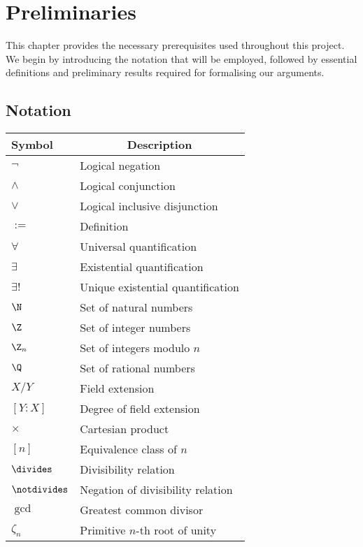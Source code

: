 \chapter{Preliminaries}

This chapter provides the necessary prerequisites used throughout this project.
We begin by introducing the notation that will be employed, followed by essential definitions and
preliminary results required for formalising our arguments.

\section{Notation}


\begin{tabular}{>{\centering}m{1.8cm} m{5.8cm}}
\toprule
\textbf{Symbol} & \multicolumn{1}{c}{\textbf{Description}} \\
\midrule
$\lnot$ & Logical negation \\
$\land$ & Logical conjunction \\
$\lor$ & Logical inclusive disjunction \\
$:=$   & Definition \\
$\forall$ & Universal quantification \\
$\exists$ & Existential quantification \\
$\exists!$ & Unique existential quantification \\
$\N$ & Set of natural numbers \\
$\Z$ & Set of integer numbers \\
$\Z_n$ & Set of integers modulo $n$ \\
$\Q$ & Set of rational numbers \\
$X/Y$ & Field extension \\
$[Y:X]$ & Degree of field extension \\
$\times$ & Cartesian product \\
$[n]$ & Equivalence class of $n$ \\
$\divides$ & Divisibility relation \\
$\notdivides$ & Negation of divisibility relation \\
$\gcd$ & Greatest common divisor \\
$\zeta_n$ & Primitive $n$-th root of unity \\
\bottomrule
\end{tabular}

